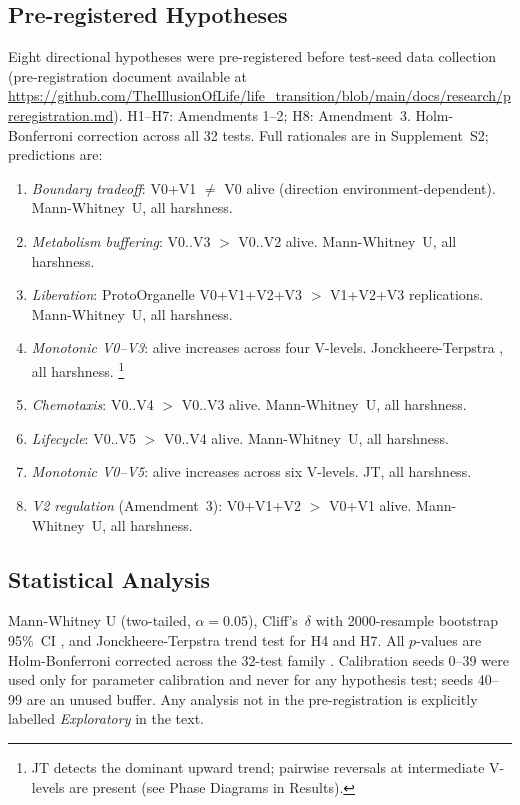 \documentclass[letterpaper]{article}
\begin{document}
\subsection{Pre-registered Hypotheses}
\label{sec:prereg}

Eight directional hypotheses were pre-registered before test-seed data
collection (pre-registration document available at
\url{https://github.com/TheIllusionOfLife/life_transition/blob/main/docs/research/preregistration.md}).
H1--H7: Amendments 1--2; H8: Amendment~3.
Holm-Bonferroni correction across all 32 tests.
Full rationales are in Supplement~S2; predictions are:

\begin{enumerate}
\item[\textbf{H1}] \emph{Boundary tradeoff}: V0+V1 $\neq$ V0 alive (direction
  environment-dependent). Mann-Whitney~U, all harshness.
\item[\textbf{H2}] \emph{Metabolism buffering}: V0..V3 $>$ V0..V2 alive.
  Mann-Whitney~U, all harshness.
\item[\textbf{H3}] \emph{Liberation}: ProtoOrganelle V0+V1+V2+V3 $>$
  V1+V2+V3 replications. Mann-Whitney~U, all harshness.
\item[\textbf{H4}] \emph{Monotonic V0--V3}: alive increases across four
  V-levels. Jonckheere-Terpstra \citep{jonckheere_1954_distribution},
  all harshness.%
  \footnote{JT detects the dominant upward trend; pairwise reversals
  at intermediate V-levels are present (see Phase Diagrams in Results).}
\item[\textbf{H5}] \emph{Chemotaxis}: V0..V4 $>$ V0..V3 alive.
  Mann-Whitney~U, all harshness.
\item[\textbf{H6}] \emph{Lifecycle}: V0..V5 $>$ V0..V4 alive.
  Mann-Whitney~U, all harshness.
\item[\textbf{H7}] \emph{Monotonic V0--V5}: alive increases across six
  V-levels. JT, all harshness.
\item[\textbf{H8}] \emph{V2 regulation} (Amendment~3): V0+V1+V2 $>$ V0+V1
  alive. Mann-Whitney~U, all harshness.
\end{enumerate}

\subsection{Statistical Analysis}

Mann-Whitney U (two-tailed, $\alpha=0.05$), Cliff's~$\delta$ with 2000-resample
bootstrap 95\%~CI \citep{cliff_1993_dominance}, and Jonckheere-Terpstra trend
test for H4 and H7.
All $p$-values are Holm-Bonferroni corrected across the 32-test family
\citep{holm_1979_simple}.
Calibration seeds 0--39 were used only for parameter calibration and never
for any hypothesis test; seeds 40--99 are an unused buffer.
Any analysis not in the pre-registration is explicitly labelled
\emph{Exploratory} in the text.
\end{document}
